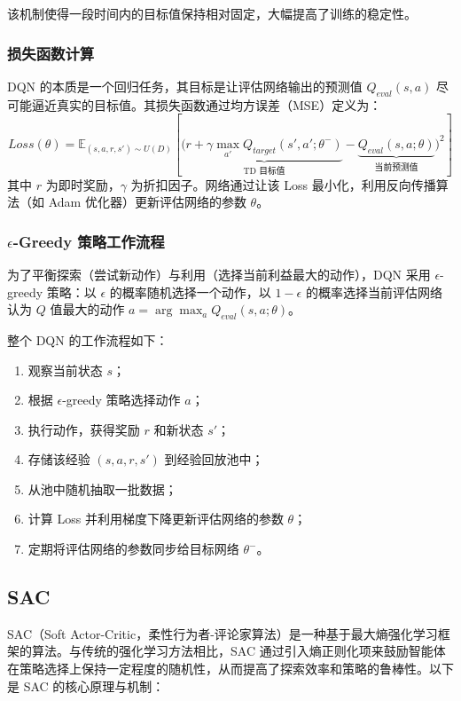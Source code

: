 该机制使得一段时间内的目标值保持相对固定，大幅提高了训练的稳定性。

\subsubsection{损失函数计算}
DQN 的本质是一个回归任务，其目标是让评估网络输出的预测值 $Q_{eval}(s, a)$ 尽可能逼近真实的目标值。其损失函数通过均方误差（MSE）定义为：
\begin{equation}
    Loss(\theta) = \mathbb{E}_{(s,a,r,s') \sim U(D)} \left[ \Big( \underbrace{r + \gamma \max_{a'} Q_{target}(s', a'; \theta^-)}_{\text{TD 目标值}} - \underbrace{Q_{eval}(s, a; \theta)}_{\text{当前预测值}} \Big)^2 \right]
\end{equation}
其中 $r$ 为即时奖励，$\gamma$ 为折扣因子。网络通过让该 Loss 最小化，利用反向传播算法（如 Adam 优化器）更新评估网络的参数 $\theta$。

\subsubsection{$\epsilon$-Greedy 策略工作流程}
为了平衡探索（尝试新动作）与利用（选择当前利益最大的动作），DQN 采用 $\epsilon$-greedy 策略：以 $\epsilon$ 的概率随机选择一个动作，以 $1 - \epsilon$ 的概率选择当前评估网络认为 $Q$ 值最大的动作 $a = \arg\max_{a} Q_{eval}(s, a; \theta)$。

整个 DQN 的工作流程如下：
\begin{enumerate}
    \item 观察当前状态 $s$；
    \item 根据 $\epsilon$-greedy 策略选择动作 $a$；
    \item 执行动作，获得奖励 $r$ 和新状态 $s'$；
    \item 存储该经验 $(s, a, r, s')$ 到经验回放池中；
    \item 从池中随机抽取一批数据；
    \item 计算 Loss 并利用梯度下降更新评估网络的参数 $\theta$；
    \item 定期将评估网络的参数同步给目标网络 $\theta^-$。
\end{enumerate}

\subsection{SAC}
SAC（Soft Actor-Critic，柔性行为者-评论家算法）是一种基于最大熵强化学习框架的算法。与传统的强化学习方法相比，SAC 通过引入熵正则化项来鼓励智能体在策略选择上保持一定程度的随机性，从而提高了探索效率和策略的鲁棒性\cite{JSJH202601001}。以下是 SAC 的核心原理与机制：

